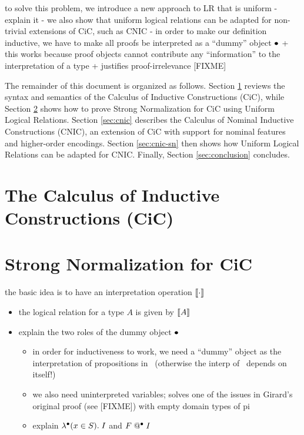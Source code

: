 \documentclass[conference]{IEEEtran}
\begin{document}
to solve this problem, we introduce a new approach to LR that is uniform
- explain it
- we also show that uniform logical relations can be adapted for non-trivial
  extensions of CiC, such as CNIC \cite{westbrook09,westbrook-thesis}
- in order to make our definition inductive, we have to make all proofs
  be interpreted as a ``dummy'' object $\bullet$
  + this works because proof objects cannot contribute any ``information''
    to the interpretation of a type
  + justifies proof-irrelevance [FIXME]


The remainder of this document is organized as follows. Section
\ref{sec:cic} reviews the syntax and semantics of the Calculus of
Inductive Constructions (CiC), while Section \ref{sec:cic-sn} shows
how to prove Strong Normalization for CiC using Uniform Logical
Relations. Section \ref{sec:cnic} describes the Calculus of Nominal
Inductive Constructions (CNIC), an extension of CiC with support for
nominal features and higher-order encodings.  Section
\ref{sec:cnic-sn} then shows how Uniform Logical Relations can be
adapted for CNIC. Finally, Section \ref{sec:conclusion} concludes.



\section{The Calculus of Inductive Constructions (CiC)}
\label{sec:cic}


\section{Strong Normalization for CiC}
\label{sec:cic-sn}

the basic idea is to have an interpretation operation $\llbracket \cdot \rrbracket^{}$
\begin{itemize}
\item the logical relation for a type $A$ is given by $\llbracket A \rrbracket^{}$
\item explain the two roles of the dummy object $\bullet$
  \begin{itemize}
  \item in order for inductiveness to work, we need a ``dummy'' object as
    the interpretation of propositions in \Prop\ (otherwise the interp of
    \Prop\ depends on itself!)
  \item we also need uninterpreted variables; solves one of the issues
    in Girard's original proof (see [FIXME]) with empty domain types of pi
  \item explain $\lambda^{\bullet} (x\in S) .\; I$ and $F \;@^{\bullet}\; I$
  \end{itemize}
\end{itemize}
\end{document}
